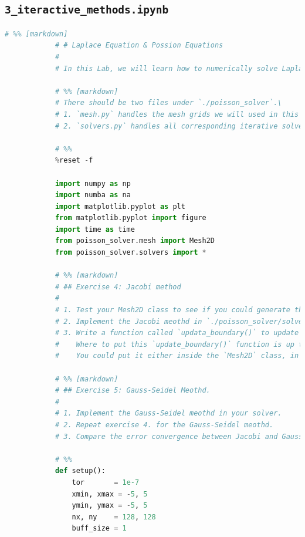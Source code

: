 \documentclass[12pt]{article}
\begin{document}
    \subsection{\texttt{3\_iteractive\_methods.ipynb}}
        \begin{lstlisting}[language={Python}]
            # %% [markdown]
            # # Laplace Equation & Possion Equations
            # 
            # In this Lab, we will learn how to numerically solve Laplace and Possion equations, which are common equations in electromagnestism and gravitational problems. 
            
            # %% [markdown]
            # There should be two files under `./poisson_solver`.\
            # 1. `mesh.py` handles the mesh grids we will used in this Lab.\
            # 2. `solvers.py` handles all corresponding iterative solvers for Laplace/Poisson Equation. 
            
            # %%
            %reset -f
            
            import numpy as np
            import numba as na
            import matplotlib.pyplot as plt
            from matplotlib.pyplot import figure
            import time as time
            from poisson_solver.mesh import Mesh2D
            from poisson_solver.solvers import *
            
            # %% [markdown]
            # ## Exercise 4: Jacobi method
            # 
            # 1. Test your Mesh2D class to see if you could generate the grids we need for this calculation
            # 2. Implement the Jacobi meothd in `./poisson_solver/solver.py`.
            # 3. Write a function called `updata_boundary()` to update the boundary conditions.\
            #    Where to put this `update_boundary()` function is up to you.\
            #    You could put it either inside the `Mesh2D` class, in `solvers.py`, or here.
            
            # %% [markdown]
            # ## Exercise 5: Gauss-Seidel Meothd.
            # 
            # 1. Implement the Gauss-Seidel meothd in your solver.
            # 2. Repeat exercise 4. for the Gauss-Seidel meothd.
            # 3. Compare the error convergence between Jacobi and Gauss-Seidel
            
            # %%
            def setup():
                tor       = 1e-7
                xmin, xmax = -5, 5
                ymin, ymax = -5, 5
                nx, ny    = 128, 128
                buff_size = 1
                

\end{lstlisting}
\end{document}
